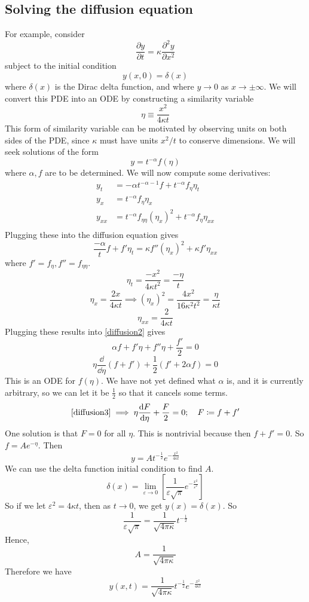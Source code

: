 \subsection{Solving the diffusion equation}
For example, consider
\[
	\frac{\partial y}{\partial t} = \kappa \frac{\partial^2 y}{\partial x^2}
\]
subject to the initial condition
\[
	y(x, 0) = \delta(x)
\]
where \(\delta(x)\) is the Dirac delta function, and where \(y \to 0\) as \(x \to \pm \infty\).
We will convert this PDE into an ODE by constructing a similarity variable
\[
	\eta \equiv \frac{x^2}{4\kappa t}
\]
This form of similarity variable can be motivated by observing units on both sides of the PDE, since \(\kappa\) must have units \(x^2/t\) to conserve dimensions.
We will seek solutions of the form
\[
	y=t^{-\alpha}f(\eta)
\]
where \(\alpha, f\) are to be determined.
We will now compute some derivatives:
\begin{align*}
	y_t    & = -\alpha t^{-\alpha-1}f + t^{-\alpha} f_\eta \eta_t               \\
	y_x    & = t^{-\alpha}f_\eta \eta_x                                         \\
	y_{xx} & = t^{-\alpha}f_{\eta\eta} (\eta_x)^2 + t^{-\alpha}f_\eta \eta_{xx} \\
\end{align*}
Plugging these into the diffusion equation gives
\begin{equation}\label{diffusion2}
	\frac{-\alpha}{t}f + f'\eta_t = \kappa f''(\eta_{x})^2 + \kappa f' \eta_{xx}
\end{equation}
where \(f'=f_\eta, f''=f_{\eta\eta}\).
\[
	\eta_t = \frac{-x^2}{4\kappa t^2} = \frac{-\eta}{t}
\]
\[
	\eta_x = \frac{2x}{4\kappa t} \implies (\eta_x)^2 = \frac{4x^2}{16\kappa^2t^2} = \frac{\eta}{\kappa t}
\]
\[
	\eta_{xx} = \frac{2}{4\kappa t}
\]
Plugging these results into \eqref{diffusion2} gives
\[
	\alpha f + f' \eta + f'' \eta + \frac{f'}{2} = 0
\]
\begin{equation}\label{diffusion3}
	\eta \frac{\dd}{\dd \eta}(f + f') + \frac{1}{2}(f' + 2\alpha f) = 0
\end{equation}
This is an ODE for \(f(\eta)\).
We have not yet defined what \(\alpha\) is, and it is currently arbitrary, so we can let it be \(\frac{1}{2}\) so that it cancels some terms.
\[
	\eqref{diffusion3} \implies \eta \frac{\dd{F}}{\dd \eta} + \frac{F}{2} = 0;\quad F \coloneq f+f'
\]
One solution is that \(F = 0\) for all \(\eta\).
This is nontrivial because then \(f + f' = 0\).
So \(f = Ae^{-\eta}\).
Then
\[
	y = At^{-\frac{1}{2}}e^{-\frac{x^2}{4\kappa t}}
\]
We can use the delta function initial condition to find \(A\).
\[
	\delta(x) = \lim_{\varepsilon \to 0} \left[ \frac{1}{\varepsilon\sqrt \pi} e^{-\frac{x^2}{\varepsilon^2}} \right]
\]
So if we let \(\varepsilon^2 = 4\kappa t\), then as \(t \to 0\), we get \(y(x) = \delta(x)\).
So
\[
	\frac{1}{\varepsilon\sqrt \pi} = \frac{1}{\sqrt{4 \pi \kappa}} t^{-\frac{1}{2}}
\]
Hence,
\[
	A = \frac{1}{\sqrt{4 \pi \kappa}}
\]
Therefore we have
\[
	y(x, t) = \frac{1}{\sqrt{4 \pi \kappa}} t^{-\frac{1}{2}} e^{-\frac{x^2}{4\kappa t}}
\]
